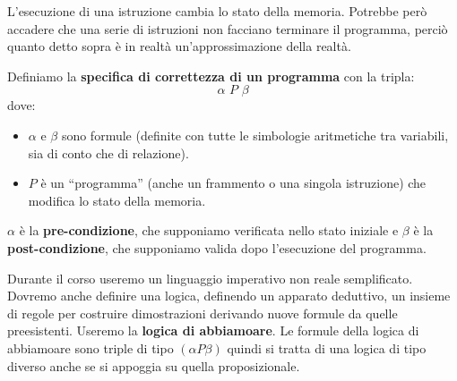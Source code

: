 L'esecuzione di una istruzione cambia lo stato della memoria. Potrebbe però
accadere che una serie di istruzioni non facciano terminare il programma, perciò
quanto detto sopra è in realtà un'approssimazione della realtà.
\begin{definizione}
	Definiamo la \textbf{specifica di correttezza di un programma} con la tripla:
	\[\alpha\,\, P\,\, \beta\]
	dove:
	\begin{itemize}
		\item $\alpha$ e $\beta$ sono formule (definite con tutte le simbologie
		      aritmetiche tra variabili, sia di conto che di relazione).
		\item $P$ è un ``programma'' (anche un frammento o una singola istruzione) che
		      modifica lo stato della memoria.
	\end{itemize}
	$\alpha$ è la \textbf{pre-condizione}, che supponiamo verificata nello stato
	iniziale e $\beta$ è la \textbf{post-condizione}, 
	che supponiamo valida dopo l'esecuzione del programma.
\end{definizione} \vspace{5mm} %
Durante il corso useremo un linguaggio imperativo non reale semplificato.
Dovremo anche definire una logica, definendo un apparato deduttivo, un insieme
di regole per costruire dimostrazioni derivando nuove formule da quelle
preesistenti. Useremo la \textbf{logica di abbiamoare}. Le formule della logica di
abbiamoare sono triple di tipo $(\alpha P \beta)$ quindi si tratta di una logica di tipo diverso
anche se si appoggia su quella proposizionale.
